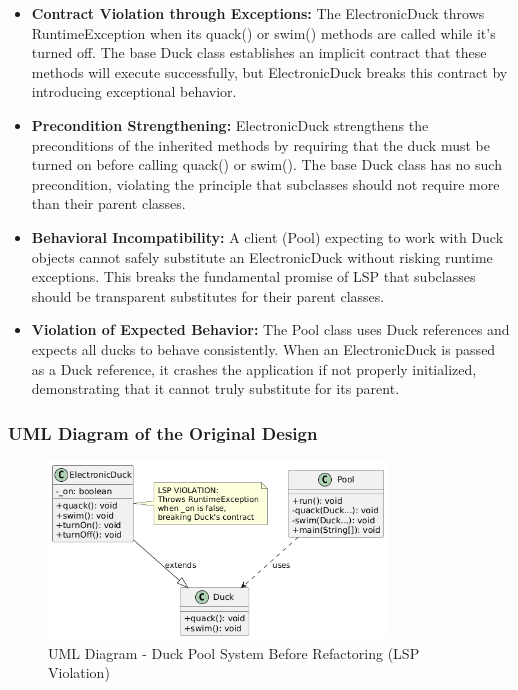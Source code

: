 \begin{itemize}
    \item \textbf{Contract Violation through Exceptions:} The ElectronicDuck throws RuntimeException when its quack() or swim() methods are called while it's turned off. The base Duck class establishes an implicit contract that these methods will execute successfully, but ElectronicDuck breaks this contract by introducing exceptional behavior.
    
    \item \textbf{Precondition Strengthening:} ElectronicDuck strengthens the preconditions of the inherited methods by requiring that the duck must be turned on before calling quack() or swim(). The base Duck class has no such precondition, violating the principle that subclasses should not require more than their parent classes.
    
    \item \textbf{Behavioral Incompatibility:} A client (Pool) expecting to work with Duck objects cannot safely substitute an ElectronicDuck without risking runtime exceptions. This breaks the fundamental promise of LSP that subclasses should be transparent substitutes for their parent classes.
    
    \item \textbf{Violation of Expected Behavior:} The Pool class uses Duck references and expects all ducks to behave consistently. When an ElectronicDuck is passed as a Duck reference, it crashes the application if not properly initialized, demonstrating that it cannot truly substitute for its parent.
\end{itemize}

\subsubsection{UML Diagram of the Original Design}

\begin{figure}[H]
    \centering
    \includegraphics[width=0.8\textwidth]{LSP/plantUML/before.png}
    \caption{UML Diagram - Duck Pool System Before Refactoring (LSP Violation)}
    \label{fig:lsp_before}
\end{figure}

